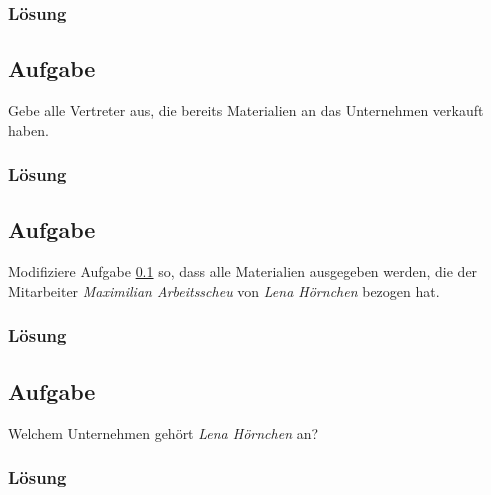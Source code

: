 \subsubsection*{Lösung}
\label{sec:uebung_01.aufgabe_05.loesung}

\subsection{Aufgabe}
\label{sec:uebung_01.aufgabe_06}
Gebe alle Vertreter aus, die bereits Materialien an das Unternehmen verkauft haben.

\subsubsection*{Lösung}
\label{sec:uebung_01.aufgabe_06.loesung}

\subsection{Aufgabe}
\label{sec:uebung_01.aufgabe_07}
Modifiziere Aufgabe \ref{sec:uebung_01.aufgabe_06} so, dass alle Materialien ausgegeben werden, die der Mitarbeiter \textit{Maximilian Arbeitsscheu} von \textit{Lena Hörnchen} bezogen hat.

\subsubsection*{Lösung}
\label{sec:uebung_01.aufgabe_07.loesung}

\subsection{Aufgabe}
\label{sec:uebung_01.aufgabe_08}
Welchem Unternehmen gehört \textit{Lena Hörnchen} an?

\subsubsection*{Lösung}
\label{sec:uebung_01.aufgabe_08.loesung}


